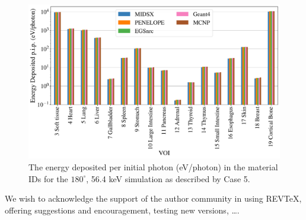 \documentclass[%
 aip,
cp,  %
 amsmath,amssymb,%
reprint,%
]{revtex4-2}
\begin{document}
\begin{figure}[H]
    \centering
	\includegraphics[width=1.0\textwidth]{../figures/CT_564_180.pdf}
	\caption{The energy deposited per initial photon (eV/photon) in the material IDs for the $180^\circ$, 56.4 keV simulation as described by Case 5.}
	\label{figure:CTGraph}
\end{figure}






\begin{acknowledgments}
We wish to acknowledge the support of the author community in using
REV\TeX{}, offering suggestions and encouragement, testing new versions,
\dots.
\end{acknowledgments}


\end{document}

